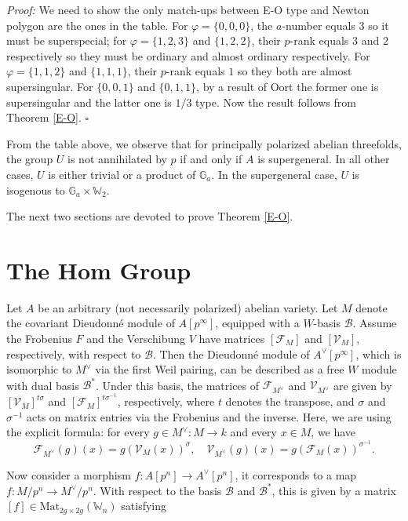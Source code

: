 \documentclass[a4paper,12pt,twoside]{report}
\newcommand{\G}{\mathbb{G}}
\newcommand{\W}{\mathbb{W}}
\begin{document}
\noindent\emph{Proof:} 
We need to show the only match-ups between E-O type and Newton polygon are the ones in the table. 
For $\varphi=\{0,0,0\}$, the $a$-number equals $3$ so it must be superspecial; 
for $\varphi=\{1,2,3\}$ and $\{1,2,2\}$, their $p$-rank equals $3$ and $2$ respectively 
so they must be ordinary and almost ordinary respectively. 
For $\varphi=\{1,1,2\}$ and $\{1,1,1\}$, their $p$-rank equals $1$ so they both are almost supersingular. 
For  $\{0,0,1\}$ and  $\{0,1,1\}$,
 by a result of Oort \cite[Theorem (8.3)]{Oo1} the former one is supersingular and the latter one is $1/3$ type. 
 Now the result follows from Theorem \ref{E-O}.
 $\square$

From the table above, we observe that for principally polarized abelian threefolds, the group 
$U$ is not annihilated by $p$ if and only if $A$ is supergeneral. 
In all other cases, $U$ is either trivial or a product of $\G_a$. 
In the supergeneral case, $U$ is isogenous to $\G_a\times \W_2$. 

The next two sections are devoted to prove Theorem \ref{E-O}.

\medskip

\section{The Hom Group}\label{SectionTheHomGroup}

Let $A$ be an arbitrary (not necessarily polarized) abelian variety. 
Let $M$ denote the covariant Dieudonn\'e module of $A[p^\infty]$, equipped with a $W$-basis $\mathcal{B}$. 
Assume the Frobenius $F$ and the Verschibung $V$ have matrices $[\mathcal{F}_M]$ and $[\mathcal{V}_M]$, respectively, with respect to $\mathcal{B}$. 
Then the Dieudonn\'e module of $A^\vee[p^\infty]$, which is isomorphic to $M^\vee$ via the first Weil pairing,
can be described as a free $W$ module with dual basis $\mathcal{B}^*$. 
Under this basis, the matrices of $\mathcal{F}_{M^\vee}$ and $\mathcal{V}_{M^\vee}$ are given by 
$[\mathcal{V}_M]^{t\sigma}$ and $[\mathcal{F}_M]^{t\sigma^{-1}}$, respectively, 
where $t$ denotes the transpose, and $\sigma$ and $\sigma^{-1}$ acts on matrix entries via the Frobenius and the inverse. 
Here, we are using the explicit formula: for every $g\in M^{\vee}:M\rightarrow k$ and every $x\in M$, we have
\[\mathcal{F}_{M^{\vee}}(g)(x)=g(\mathcal{V}_M(x))^{\sigma}, \quad \mathcal{V}_{M^{\vee}}(g)(x)=g(\mathcal{F}_M(x))^{\sigma^{-1}}.\]

Now consider a morphism $f:A[p^n]\rightarrow A^\vee[p^n]$, it corresponds to a map $f:M/p^n\rightarrow M^{\vee}/p^n$. 
With respect to the basis $\mathcal{B}$ and $\mathcal{B}^*$, 
this is given by a matrix $[f]\in \mathrm{Mat}_{2g\times 2g}(\W_{n})$ satisfying 
\end{document}

